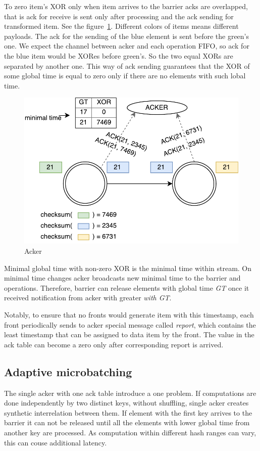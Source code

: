 To zero item's XOR only when item arrives to the barrier acks are overlapped, that is ack for receive is sent only after processing and the ack sending for transformed item. See the figure~\ref{acker}. Different colors of items means different payloads. The ack for the sending of the blue element is sent before the green's one. We expect the channel between acker and each operation FIFO, so ack for the blue item would be XORes before green's. So the two equal XORs are separated by another one. This way of ack sending guarantees that the XOR of some global time is equal to zero only if there are no elements with such lobal time.

\begin{figure}[htbp]
  \centering
  \includegraphics[scale=0.5]{pics/acker}
  \caption{Acker}
  \label {acker}
\end{figure}

Minimal global time with non-zero XOR is the minimal time within stream. On minimal time changes acker broadcasts new minimal time to the barrier and operations. Therefore, barrier can release elements with global time {\it GT} once it received notification from acker with greater {\it with GT}.

Notably, to ensure that no fronts would generate item with this timestamp, each front periodically sends to acker special message called {\it report}, which contains the least timestamp that can be assigned to data item by the front. The value in the ack table can become a zero only after corresponding report is arrived.  

\subsection{Adaptive microbatching}
The single acker with one ack table introduce a one problem. If computations are done independently by two distinct keys, without shuffling, single acker creates synthetic interrelation between them. If element with the first key arrives to the barrier it can not be released until all the elements with lower global time from another key are processed. As computation within different hash ranges can vary, this can couse additional latency.

